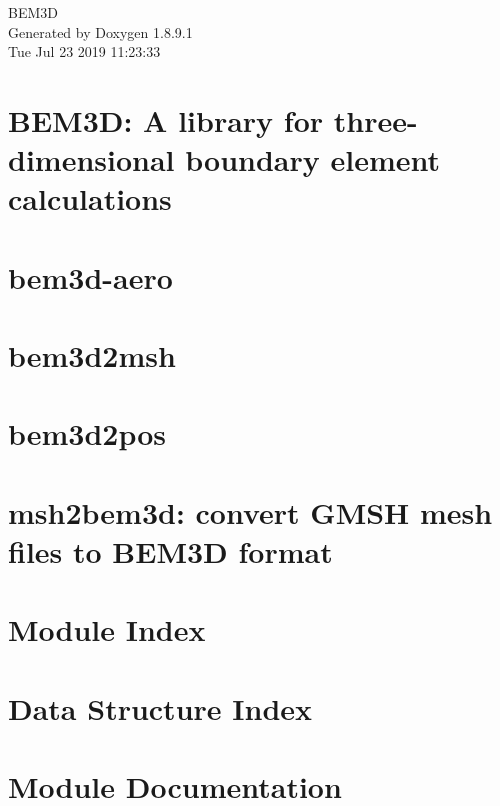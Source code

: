 \documentclass[twoside]{book}
\newcommand{\+}{\discretionary{\mbox{\scriptsize$\hookleftarrow$}}{}{}}
\newcommand{\clearemptydoublepage}{%
  \newpage{\pagestyle{empty}\cleardoublepage}%
}
\begin{document}
\begin{titlepage}
\vspace*{7cm}
\begin{center}%
{\Large B\+E\+M3\+D }\\
\vspace*{1cm}
{\large Generated by Doxygen 1.8.9.1}\\
\vspace*{0.5cm}
{\small Tue Jul 23 2019 11:23:33}\\
\end{center}
\end{titlepage}
\clearemptydoublepage
\tableofcontents
\clearemptydoublepage
{}

\chapter{B\+E\+M3\+D\+: A library for three-\/dimensional boundary element calculations}
\label{index}
\chapter{bem3d-\/aero}
\label{bem3daero}

\chapter{bem3d2msh}
\label{bem3d2msh}

\chapter{bem3d2pos}
\label{bem3d2pos}

\chapter{msh2bem3d\+: convert G\+M\+S\+H mesh files to B\+E\+M3\+D format}
\label{msh2bem3d}

\chapter{Module Index}

\chapter{Data Structure Index}

\chapter{Module Documentation}
























\end{document}
